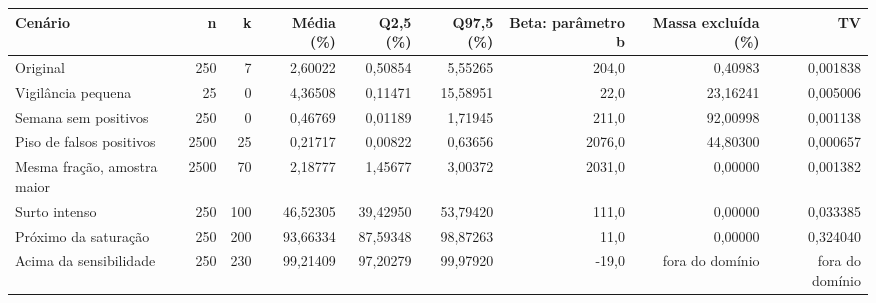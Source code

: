 \begin{tabular}{lrrrrrrrr}
\toprule
Cenário & n & k & Média (\%) & Q2,5 (\%) & Q97,5 (\%) & Beta: parâmetro b & Massa excluída (\%) & TV \\
\midrule
Original & 250 & 7 & 2,60022 & 0,50854 & 5,55265 & 204,0 & 0,40983 & 0,001838 \\
Vigilância pequena & 25 & 0 & 4,36508 & 0,11471 & 15,58951 & 22,0 & 23,16241 & 0,005006 \\
Semana sem positivos & 250 & 0 & 0,46769 & 0,01189 & 1,71945 & 211,0 & 92,00998 & 0,001138 \\
Piso de falsos positivos & 2500 & 25 & 0,21717 & 0,00822 & 0,63656 & 2076,0 & 44,80300 & 0,000657 \\
Mesma fração, amostra maior & 2500 & 70 & 2,18777 & 1,45677 & 3,00372 & 2031,0 & 0,00000 & 0,001382 \\
Surto intenso & 250 & 100 & 46,52305 & 39,42950 & 53,79420 & 111,0 & 0,00000 & 0,033385 \\
Próximo da saturação & 250 & 200 & 93,66334 & 87,59348 & 98,87263 & 11,0 & 0,00000 & 0,324040 \\
Acima da sensibilidade & 250 & 230 & 99,21409 & 97,20279 & 99,97920 & -19,0 & fora do domínio & fora do domínio \\
\bottomrule
\end{tabular}
